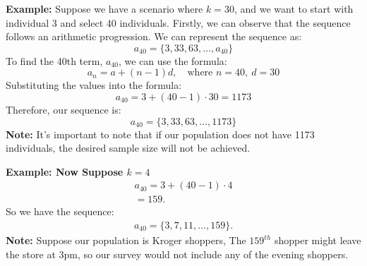 \documentclass{report}
\begin{document}
        \bigbreak \noindent 
        \begin{mdframed}
            \textbf{Example:}
            Suppose we have a scenario where $k = 30$, and we want to start with individual 3 and select 40 individuals.
            \bigbreak \noindent 
            Firstly, we can observe that the sequence follows an arithmetic progression.
            \bigbreak \noindent 
            We can represent the sequence as:
            \bigbreak \noindent 
            \[a_{40} = \{3, 33, 63, \ldots, a_{40}\}\]
            \bigbreak \noindent 
            To find the 40th term, $a_{40}$, we can use the formula:
            \bigbreak \noindent 
            \[a_{n} = a + (n-1)d,\quad \text{where } n = 40,\ d = 30\]
            \bigbreak \noindent 
            Substituting the values into the formula:
            \bigbreak \noindent 
            \[a_{40} = 3 + (40-1) \cdot 30 = 1173\]
            \bigbreak \noindent 
            Therefore, our sequence is:
            \bigbreak \noindent 
            \[a_{40} = \{3, 33, 63, \ldots, 1173\}\]
            \bigbreak \noindent 
            \textbf{Note:} It's important to note that if our population does not have 1173 individuals, the desired sample size will not be achieved.
            \bigbreak \noindent 
        \end{mdframed}
        \bigbreak \noindent 
        \begin{mdframed}
          \textbf{Example: Now Suppose $k=4$}
          \bigbreak \noindent 
          \begin{align*}
              a_{40} = 3 + (40-1)\cdot 4 \\
              = 159
          .\end{align*}
          \bigbreak \noindent 
          So we have the sequence:
          \begin{align*}
              a_{40} = \{3,7,11,...,159\}
          .\end{align*}
          \bigbreak \noindent 
          \textbf{Note:} Suppose our population is Kroger shoppers, The $159^{th}$ shopper might leave the store at 3pm, so our survey would not include any of the evening shoppers.
        \end{mdframed}
        \bigbreak \noindent 
\end{document}
